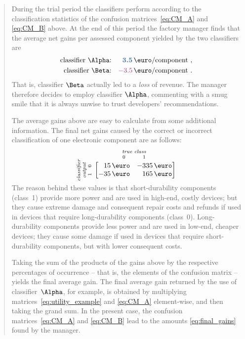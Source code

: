 \documentclass[\ifafour a4paper,12pt,\else a5paper,10pt,\fi%
onecolumn,oneside,article,%
british%
]{memoir}
\theoremstyle{remark}
\theoremstyle{innote}
\renewcommand*{\|}[1][]{\nonscript\:#1\vert\nonscript\:\mathopen{}}
\newcommand*{\good}[1]{\ensuremath{{\color{mypurpleblue}\bm{#1}}}}
\newcommand*{\bad}[1]{\ensuremath{{\color{myredpurple}#1}}}
\begin{document}
\begin{quotation}
During the trial period the classifiers perform according to the classification statistics of the confusion matrices~\eqref{eq:CM_A} and \eqref{eq:CM_B} above. At the end of this period the factory manager finds that the average net gains per assessed component yielded by the two classifiers are
\begin{equation}
  \label{eq:final_gains}
\begin{aligned}
  \text{classifier $\Alpha$:}& & \good{3.5}\,\text{\texteuro/component}&\ , \\
  \text{classifier $\Beta$:}& &\bad{-3.5}\,\text{\texteuro/component}&\ .
\end{aligned}
\end{equation}
That is, classifier $\Beta$ actually led to a \emph{loss} of revenue. The manager therefore decides to employ classifier $\Alpha$, commenting with a smug smile that it is always unwise to trust developers' recommendations.

The average gains above are easy to calculate from some additional information. The final net gains caused by the correct or incorrect classification of one electronic component are as follows:
\begin{equation}
  \label{eq:utility_example}
  \rotatebox[origin=c]{90}{
    \clap{\textit{\parbox{5em}{\centering\scriptsize classifier\\output\\$1\quad 0$}}
    }}\ 
    \overbracket[0pt]{
      \begin{bmatrix*}[r]
        15\,\text{\texteuro} & -335\,\text{\texteuro}  \\
        -35\,\text{\texteuro} & 165\,\text{\texteuro}
      \end{bmatrix*}}^{
      \clap{\textit{\parbox{6em}{\centering\scriptsize true class\\$0\hspace{3em}1$}}
    }}
\end{equation}
The reason behind these values is that short-durability components (class~1) provide more power and are used in high-end, costly devices; but they cause extreme damage and consequent repair costs and refunds if used in devices that require long-durability components (class~0). Long-durability components provide less power and are used in low-end, cheaper devices; they cause some damage if used in devices that require short-durability components, but with lower consequent costs.

Taking the sum of the products of the gains above by the respective percentages of occurrence -- that is, the elements of the confusion matrix -- yields the final average gain. The final average gain returned by the use of classifier~$\Alpha$, for example, is obtained by multiplying matrices~\eqref{eq:utility_example} and \eqref{eq:CM_A} element-wise, and then taking the grand sum. In the present case, the confusion matrices~\eqref{eq:CM_A} and \eqref{eq:CM_B} lead to the amounts \eqref{eq:final_gains} found by the manager.



\end{quotation}
\end{document}
